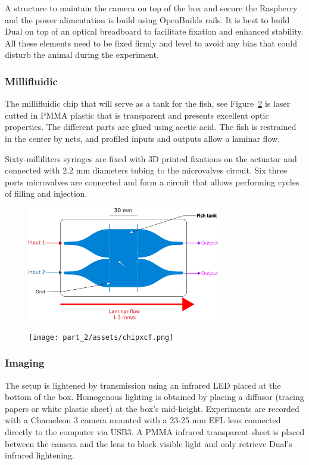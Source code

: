   A structure to maintain the camera on top of the box and secure the Raspberry and the power alimentation is build using OpenBuilds rails. It is best to build Dual on top of an optical breadboard to facilitate fixation and enhanced stability. All these elements need to be fixed firmly and level to avoid any bias that could disturb the animal during the experiment.

  \subsubsection{Millifluidic}
  The millifluidic chip that will serve as a tank for the fish, see Figure~\ref{dual_chip_visu} is laser cutted in PMMA plastic that is transparent and presents excellent optic properties. The different parts are glued using acetic acid. The fish is restrained in the center by nets, and profiled inputs and outputs allow a laminar flow.

  Sixty-milliliters syringes are fixed with 3D printed fixations on the actuator and connected with 2.2 mm diameters tubing to the microvalves circuit. Six three ports microvalves are connected and form a circuit that allows performing cycles of filling and injection.

    \begin{figure}[h]
      \centering
      \includegraphics[width=0.75\textwidth]{part_2/assets/chip.png}
      \caption{\textbf{}}
      \label{dual_chip}
    \end{figure}

    \begin{figure}[h]
      \centering
      \texttt{[image: part\_2/assets/chipxcf.png]}
      \caption{\textbf{}}
      \label{dual_chip_visu}
    \end{figure}

  \subsubsection{Imaging}
  The setup is lightened by transmission using an infrared LED placed at the bottom of the box. Homogenous lighting is obtained by placing a diffusor (tracing papers or white plastic sheet) at the box's mid-height. Experiments are recorded with a Chameleon 3 camera mounted with a 23-25 mm EFL lens connected directly to the computer via USB3. A PMMA infrared transparent sheet is placed between the camera and the lens to block visible light and only retrieve Dual's infrared lightening.

